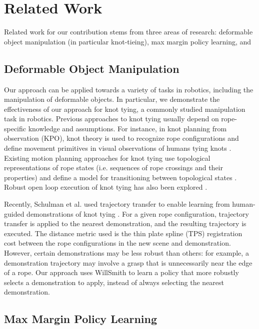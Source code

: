 \section{Related Work}
Related work for our contribution stems from three areas of research: deformable object manipulation (in particular knot-tieing), max margin policy learning, and 
\subsection{Deformable Object Manipulation}
Our approach can be applied towards a variety of tasks in robotics,
including the manipulation of deformable objects.
In particular, we demonstrate the effectiveness of our approach for
knot tying, a commonly studied manipulation task in robotics.
Previous approaches to knot tying usually depend on rope-specific knowledge
and assumptions.
For instance, in knot planning from observation (KPO), knot theory is used
to recognize rope configurations and define movement primitives in visual
observations of humans tying knots \cite{Morita_ICRA2003, Takamatsu_TransRob2006}.
Existing motion planning approaches for knot tying use topological
representations of rope states (i.e. sequences of rope crossings and their
properties) and define a model for transitioning between topological states
\cite{Saha_ExpRobotics2008, Wakamatsu_IJRR2006}.
Robust open loop execution of knot tying has also been explored \cite{Bell_PhD2010}.

Recently, Schulman et al. used trajectory transfer to enable learning
from human-guided demonstrations of knot tying \cite{Schulmanetal_ISRR2013}.
For a given rope configuration, trajectory transfer is applied to the nearest
demonstration, and the resulting trajectory is executed.
The distance metric used is the thin plate spline (TPS) registration
cost between the rope configurations in the new scene and demonstration.
However, certain demonstrations may be less robust than others: for example,
a demonstration trajectory may involve a grasp that is unnecessarily near
the edge of a rope.
Our approach uses WillSmith to learn a policy that more robustly selects a
demonstration to apply, instead of always selecting the nearest demonstration.
\subsection{Max Margin Policy Learning}
